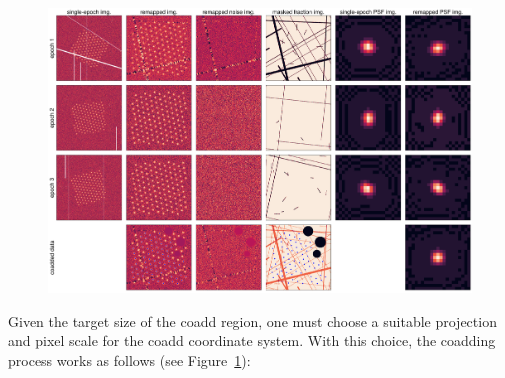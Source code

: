 \documentclass[twocolappendix, appendixfloats, numberedappendix, twocolumn, apj]{openjournal}
\begin{document}
\begin{figure}
    \begin{center}
        \includegraphics[width=\textwidth]{allsteps.png}
        \caption{\label{fig:allsteps}}
    \end{center}
\end{figure}

Given the target size of the coadd region, one must choose a suitable projection
and pixel scale for the coadd coordinate system. With this choice, the coadding process
works as follows (see Figure~\ref{fig:allsteps}):
\end{document}
